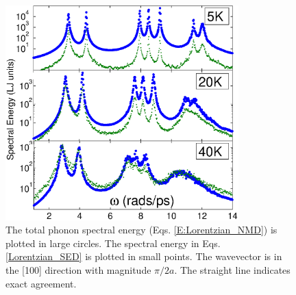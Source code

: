 \documentclass[twocolumn,10pt]{asme2e}
\begin{document}
\begin{figure}
\begin{center}
\includegraphics[angle=0,width=90.0mm]{LJ_NMD_SED_PEAK_COMPARE.eps}
\end{center}
\caption{\label{F:PEAK_COMPARE} The total phonon spectral energy (Eqs$.$ \eqref{E:Lorentzian_NMD}) is plotted in large circles.  The spectral energy in Eqs$.$ \eqref{Lorentzian_SED} is plotted in small points. The wavevector is in the [100] direction with magnitude $\pi/2a$. The straight line indicates exact agreement.}
\vspace*{-5mm}
\end{figure}
\end{document}

